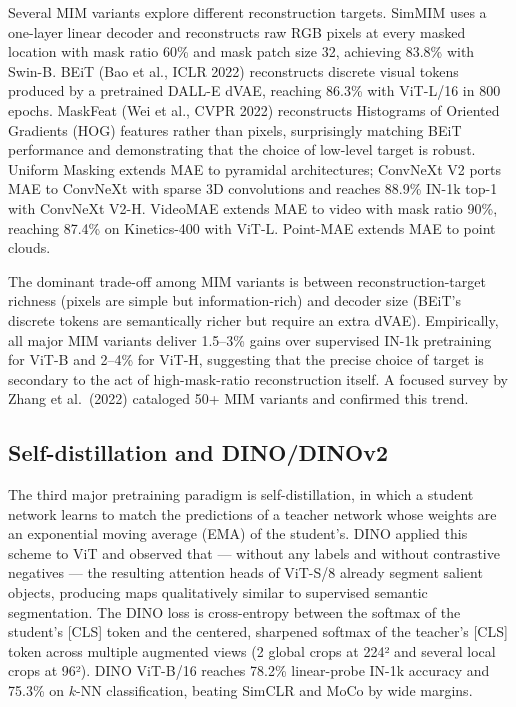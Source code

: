 \documentclass{article}
\begin{document}
Several MIM variants explore different reconstruction targets. SimMIM uses a one-layer linear decoder and reconstructs raw RGB pixels at every masked location with mask ratio 60\% and mask patch size 32, achieving 83.8\% with Swin-B. BEiT (Bao et al., ICLR 2022) reconstructs discrete visual tokens produced by a pretrained DALL-E dVAE, reaching 86.3\% with ViT-L/16 in 800 epochs. MaskFeat (Wei et al., CVPR 2022) reconstructs Histograms of Oriented Gradients (HOG) features rather than pixels, surprisingly matching BEiT performance and demonstrating that the choice of low-level target is robust. Uniform Masking \citep{li2023transformerbasedvi} extends MAE to pyramidal architectures; ConvNeXt V2 \citep{woo2023convnextv2codesign} ports MAE to ConvNeXt with sparse 3D convolutions and reaches 88.9\% IN-1k top-1 with ConvNeXt V2-H. VideoMAE \citep{tong2022videomaemaskedauto} extends MAE to video with mask ratio 90\%, reaching 87.4\% on Kinetics-400 with ViT-L. Point-MAE \citep{pang2022maskedautoencoders} extends MAE to point clouds.

The dominant trade-off among MIM variants is between reconstruction-target richness (pixels are simple but information-rich) and decoder size (BEiT's discrete tokens are semantically richer but require an extra dVAE). Empirically, all major MIM variants deliver 1.5--3\% gains over supervised IN-1k pretraining for ViT-B and 2--4\% for ViT-H, suggesting that the precise choice of target is secondary to the act of high-mask-ratio reconstruction itself. A focused survey by Zhang et al.~(2022) cataloged 50+ MIM variants and confirmed this trend.

\subsection{Self-distillation and DINO/DINOv2}\label{self-distillation-and-dinodinov2}

The third major pretraining paradigm is self-distillation, in which a student network learns to match the predictions of a teacher network whose weights are an exponential moving average (EMA) of the student's. DINO \citep{caron2021emergingproperties} applied this scheme to ViT and observed that --- without any labels and without contrastive negatives --- the resulting attention heads of ViT-S/8 already segment salient objects, producing maps qualitatively similar to supervised semantic segmentation. The DINO loss is cross-entropy between the softmax of the student's {[}CLS{]} token and the centered, sharpened softmax of the teacher's {[}CLS{]} token across multiple augmented views (2 global crops at 224² and several local crops at 96²). DINO ViT-B/16 reaches 78.2\% linear-probe IN-1k accuracy and 75.3\% on \(k\)-NN classification, beating SimCLR and MoCo by wide margins.
\end{document}
